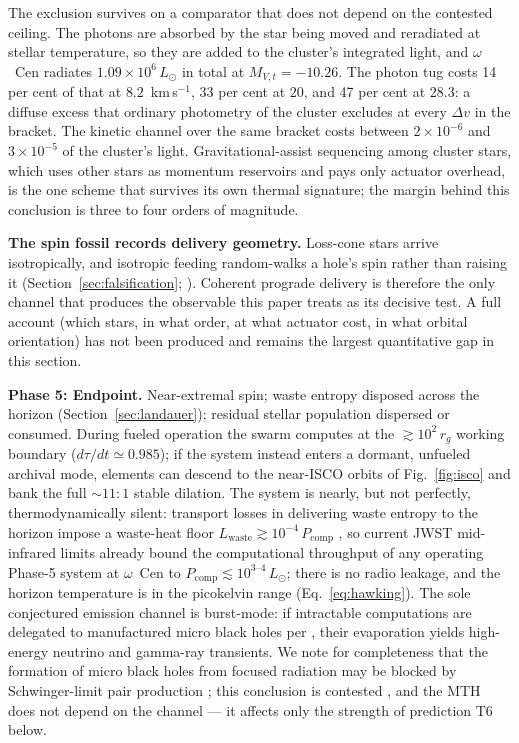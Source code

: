 \documentclass[11pt]{article}
\begin{document}
The exclusion survives on a comparator that does not depend on the contested ceiling. The photons are absorbed by the star being moved and reradiated at stellar temperature, so they are added to the cluster's integrated light, and $\omega$~Cen radiates $1.09\times10^{6}\,L_\odot$ in total at $M_{V,t} = -10.26$. The photon tug costs 14 per cent of that at $8.2$~km\,s$^{-1}$, 33 per cent at $20$, and 47 per cent at $28.3$: a diffuse excess that ordinary photometry of the cluster excludes at every $\Delta v$ in the bracket. The kinetic channel over the same bracket costs between $2\times10^{-6}$ and $3\times10^{-5}$ of the cluster's light. Gravitational-assist sequencing among cluster stars, which uses other stars as momentum reservoirs and pays only actuator overhead, is the one scheme that survives its own thermal signature; the margin behind this conclusion is three to four orders of magnitude.

\textbf{The spin fossil records delivery geometry.} Loss-cone stars arrive isotropically, and isotropic feeding random-walks a hole's spin rather than raising it (Section~\ref{sec:falsification}; \citealt{Swanson2026Engineered}). Coherent prograde delivery is therefore the only channel that produces the observable this paper treats as its decisive test. A full account (which stars, in what order, at what actuator cost, in what orbital orientation) has not been produced and remains the largest quantitative gap in this section.

\textbf{Phase 5: Endpoint.} Near-extremal spin; waste entropy disposed across the horizon (Section~\ref{sec:landauer}); residual stellar population dispersed or consumed. During fueled operation the swarm computes at the $\gtrsim 10^{2}\,r_g$ working boundary ($d\tau/dt \simeq 0.985$); if the system instead enters a dormant, unfueled archival mode, elements can descend to the near-ISCO orbits of Fig.~\ref{fig:isco} and bank the full $\sim$$11{:}1$ stable dilation. The system is nearly, but not perfectly, thermodynamically silent: transport losses in delivering waste entropy to the horizon impose a waste-heat floor $L_{\mathrm{waste}} \gtrsim 10^{-4}\,P_{\mathrm{comp}}$ \citep{Swanson2026Engineered}, so current JWST mid-infrared limits already bound the computational throughput of any operating Phase-5 system at $\omega$~Cen to $P_{\mathrm{comp}} \lesssim 10^{3\text{--}4}\,L_\odot$; there is no radio leakage, and the horizon temperature is in the picokelvin range (Eq.~\ref{eq:hawking}). The sole conjectured emission channel is burst-mode: if intractable computations are delegated to manufactured micro black holes per \citet{Dvali2023}, their evaporation yields high-energy neutrino and gamma-ray transients. We note for completeness that the formation of micro black holes from focused radiation may be blocked by Schwinger-limit pair production \citep{AlvarezDominguez2024,BreitWheeler1934,Schwinger1951}; this conclusion is contested \citep{Loeb2024Comment}, and the MTH does not depend on the channel --- it affects only the strength of prediction T6 below.
\end{document}
